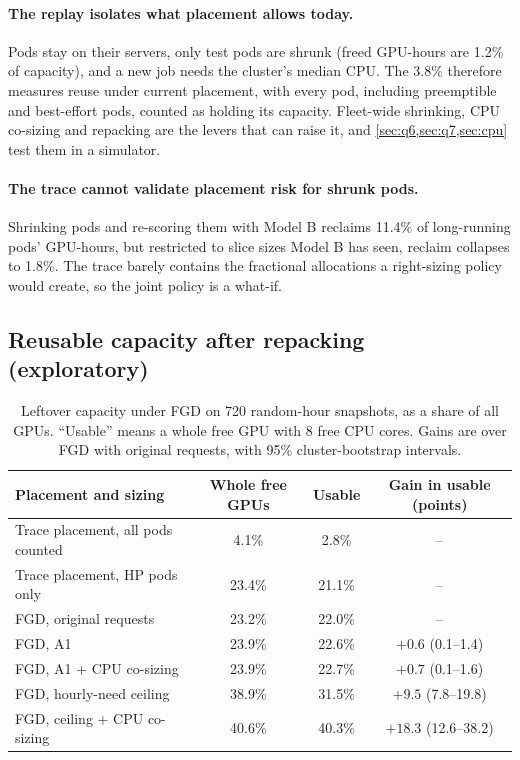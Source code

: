 \documentclass[10pt]{article}
\newcommand{\finding}[1]{\paragraph{#1}}
\begin{document}
\finding{The replay isolates what placement allows today.} Pods stay on their servers, only test pods are shrunk (freed GPU-hours are 1.2\% of capacity), and a new job needs the cluster's median CPU. The 3.8\% therefore measures reuse under current placement, with every pod, including preemptible and best-effort pods, counted as holding its capacity. Fleet-wide shrinking, CPU co-sizing and repacking are the levers that can raise it, and \cref{sec:q6,sec:q7,sec:cpu} test them in a simulator.

\finding{The trace cannot validate placement risk for shrunk pods.} Shrinking pods and re-scoring them with Model B reclaims 11.4\% of long-running pods' GPU-hours, but restricted to slice sizes Model B has seen, reclaim collapses to 1.8\%. The trace barely contains the fractional allocations a right-sizing policy would create, so the joint policy is a what-if.

\subsection{Reusable capacity after repacking (exploratory)}
\label{sec:q6}

\begin{table}[t]
\centering\small
\caption{Leftover capacity under FGD on 720 random-hour snapshots, as a share of all GPUs. ``Usable'' means a whole free GPU with 8 free CPU cores. Gains are over FGD with original requests, with 95\% cluster-bootstrap intervals.}
\label{tab:emulator}
\begin{tabular}{@{}lccc@{}}
\toprule
Placement and sizing & Whole free GPUs & Usable & Gain in usable (points) \\
\midrule
Trace placement, all pods counted & 4.1\% & 2.8\% & -- \\
Trace placement, HP pods only & 23.4\% & 21.1\% & -- \\
\midrule
FGD, original requests & 23.2\% & 22.0\% & -- \\
FGD, A1 & 23.9\% & 22.6\% & $+0.6$ (0.1--1.4) \\
FGD, A1 + CPU co-sizing & 23.9\% & 22.7\% & $+0.7$ (0.1--1.6) \\
FGD, hourly-need ceiling & 38.9\% & 31.5\% & $+9.5$ (7.8--19.8) \\
FGD, ceiling + CPU co-sizing & 40.6\% & 40.3\% & $\mathbf{+18.3}$ (12.6--38.2) \\
\bottomrule
\end{tabular}
\end{table}
\end{document}
